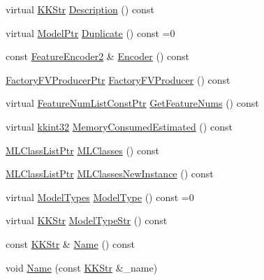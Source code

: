 \begin{DoxyCompactItemize}
\item 
virtual \hyperlink{class_k_k_b_1_1_k_k_str}{K\+K\+Str} \hyperlink{class_k_k_m_l_l_1_1_model_a99f1cf513a3447ddc200fb8beb870c36}{Description} () const 
\item 
virtual \hyperlink{class_k_k_m_l_l_1_1_model_a9560fa355dc53fa82541f55582a6d6ea}{Model\+Ptr} \hyperlink{class_k_k_m_l_l_1_1_model_ab45f8caa5e4ad12250c1f737c8b79278}{Duplicate} () const  =0
\item 
const \hyperlink{class_k_k_m_l_l_1_1_feature_encoder2}{Feature\+Encoder2} \& \hyperlink{class_k_k_m_l_l_1_1_model_acf575d1a56f4821eeba56b7ee3133f12}{Encoder} () const 
\item 
\hyperlink{namespace_k_k_m_l_l_a82812d1feb85a6cff72d059bc67bb90e}{Factory\+F\+V\+Producer\+Ptr} \hyperlink{class_k_k_m_l_l_1_1_model_a698cbb3911c644af2e85fe19df4cb062}{Factory\+F\+V\+Producer} () const 
\item 
virtual \hyperlink{namespace_k_k_m_l_l_a81284b0a14973267260023f9a72da94a}{Feature\+Num\+List\+Const\+Ptr} \hyperlink{class_k_k_m_l_l_1_1_model_a290bc08e4ee6aff7ed029cd423c29807}{Get\+Feature\+Nums} () const 
\item 
virtual \hyperlink{namespace_k_k_b_a8fa4952cc84fda1de4bec1fbdd8d5b1b}{kkint32} \hyperlink{class_k_k_m_l_l_1_1_model_a8d8d22b5f8101e0749644583f818c86b}{Memory\+Consumed\+Estimated} () const 
\item 
\hyperlink{namespace_k_k_m_l_l_af091cde3f4a4315658b41a5e7583fc26}{M\+L\+Class\+List\+Ptr} \hyperlink{class_k_k_m_l_l_1_1_model_adebde57c62484e9599bcd1da57ec1f4f}{M\+L\+Classes} () const 
\item 
\hyperlink{namespace_k_k_m_l_l_af091cde3f4a4315658b41a5e7583fc26}{M\+L\+Class\+List\+Ptr} \hyperlink{class_k_k_m_l_l_1_1_model_ad80398f287a4901a99ecf8bd3eaf6750}{M\+L\+Classes\+New\+Instance} () const 
\item 
virtual \hyperlink{class_k_k_m_l_l_1_1_model_aeda4060e088c67446ca993eefcecea06}{Model\+Types} \hyperlink{class_k_k_m_l_l_1_1_model_af2e8e6fa4163bc16d07a3a1fa20ea3f9}{Model\+Type} () const  =0
\item 
virtual \hyperlink{class_k_k_b_1_1_k_k_str}{K\+K\+Str} \hyperlink{class_k_k_m_l_l_1_1_model_a6677e2a970c84c5278b682400f781eb0}{Model\+Type\+Str} () const 
\item 
const \hyperlink{class_k_k_b_1_1_k_k_str}{K\+K\+Str} \& \hyperlink{class_k_k_m_l_l_1_1_model_afe3e1b7d4066a438266320ec6efd43de}{Name} () const 
\item 
void \hyperlink{class_k_k_m_l_l_1_1_model_adf3dc30cf4e8b38c194442ef5692bafe}{Name} (const \hyperlink{class_k_k_b_1_1_k_k_str}{K\+K\+Str} \&\+\_\+name)

\end{DoxyCompactItemize}
